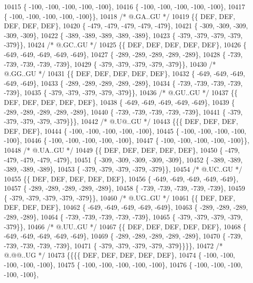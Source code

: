 \begin{DoxyCode}
10415 \{ -100, -100, -100, -100, -100\},
10416 \{ -100, -100, -100, -100, -100\},
10417 \{ -100, -100, -100, -100, -100\}\},
10418 \textcolor{comment}{/*  @.GA..GU */}
10419 \{\{  DEF,  DEF,  DEF,  DEF,  DEF\},
10420 \{ -479, -479, -479, -479, -479\},
10421 \{ -309, -309, -309, -309, -309\},
10422 \{ -389, -389, -389, -389, -389\},
10423 \{ -379, -379, -379, -379, -379\}\},
10424 \textcolor{comment}{/*  @.GC..GU */}
10425 \{\{  DEF,  DEF,  DEF,  DEF,  DEF\},
10426 \{ -649, -649, -649, -649, -649\},
10427 \{ -289, -289, -289, -289, -289\},
10428 \{ -739, -739, -739, -739, -739\},
10429 \{ -379, -379, -379, -379, -379\}\},
10430 \textcolor{comment}{/*  @.GG..GU */}
10431 \{\{  DEF,  DEF,  DEF,  DEF,  DEF\},
10432 \{ -649, -649, -649, -649, -649\},
10433 \{ -289, -289, -289, -289, -289\},
10434 \{ -739, -739, -739, -739, -739\},
10435 \{ -379, -379, -379, -379, -379\}\},
10436 \textcolor{comment}{/*  @.GU..GU */}
10437 \{\{  DEF,  DEF,  DEF,  DEF,  DEF\},
10438 \{ -649, -649, -649, -649, -649\},
10439 \{ -289, -289, -289, -289, -289\},
10440 \{ -739, -739, -739, -739, -739\},
10441 \{ -379, -379, -379, -379, -379\}\}\},
10442 \textcolor{comment}{/*  @.U@..GU */}
10443 \{\{\{  DEF,  DEF,  DEF,  DEF,  DEF\},
10444 \{ -100, -100, -100, -100, -100\},
10445 \{ -100, -100, -100, -100, -100\},
10446 \{ -100, -100, -100, -100, -100\},
10447 \{ -100, -100, -100, -100, -100\}\},
10448 \textcolor{comment}{/*  @.UA..GU */}
10449 \{\{  DEF,  DEF,  DEF,  DEF,  DEF\},
10450 \{ -479, -479, -479, -479, -479\},
10451 \{ -309, -309, -309, -309, -309\},
10452 \{ -389, -389, -389, -389, -389\},
10453 \{ -379, -379, -379, -379, -379\}\},
10454 \textcolor{comment}{/*  @.UC..GU */}
10455 \{\{  DEF,  DEF,  DEF,  DEF,  DEF\},
10456 \{ -649, -649, -649, -649, -649\},
10457 \{ -289, -289, -289, -289, -289\},
10458 \{ -739, -739, -739, -739, -739\},
10459 \{ -379, -379, -379, -379, -379\}\},
10460 \textcolor{comment}{/*  @.UG..GU */}
10461 \{\{  DEF,  DEF,  DEF,  DEF,  DEF\},
10462 \{ -649, -649, -649, -649, -649\},
10463 \{ -289, -289, -289, -289, -289\},
10464 \{ -739, -739, -739, -739, -739\},
10465 \{ -379, -379, -379, -379, -379\}\},
10466 \textcolor{comment}{/*  @.UU..GU */}
10467 \{\{  DEF,  DEF,  DEF,  DEF,  DEF\},
10468 \{ -649, -649, -649, -649, -649\},
10469 \{ -289, -289, -289, -289, -289\},
10470 \{ -739, -739, -739, -739, -739\},
10471 \{ -379, -379, -379, -379, -379\}\}\}\},
10472 \textcolor{comment}{/*  @.@@..UG */}
10473 \{\{\{\{  DEF,  DEF,  DEF,  DEF,  DEF\},
10474 \{ -100, -100, -100, -100, -100\},
10475 \{ -100, -100, -100, -100, -100\},
10476 \{ -100, -100, -100, -100, -100\},

\end{DoxyCode}
